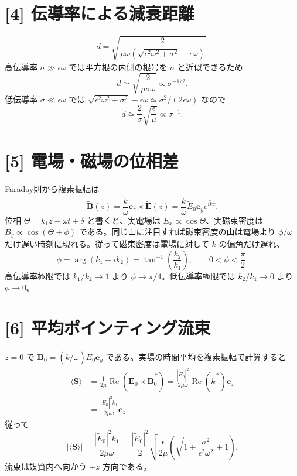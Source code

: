 \documentclass[11pt,a4paper]{article}
\begin{document}
\section*{[4] 伝導率による減衰距離}
\begin{equation}
 d=\sqrt{\frac{2}{\mu\omega\left(\sqrt{\epsilon^2\omega^2+\sigma^2}-\epsilon\omega\right)}}.
\end{equation}
高伝導率 $\sigma\gg\epsilon\omega$ では平方根の内側の根号を $\sigma$ と近似できるため
\begin{equation}
 \boxed{d\simeq\sqrt{\frac{2}{\mu\sigma\omega}}\propto\sigma^{-1/2}}.
\end{equation}
低伝導率 $\sigma\ll\epsilon\omega$ では
$\sqrt{\epsilon^2\omega^2+\sigma^2}-\epsilon\omega\simeq\sigma^2/(2\epsilon\omega)$ なので
\begin{equation}
 \boxed{d\simeq\frac{2}{\sigma}\sqrt{\frac{\epsilon}{\mu}}\propto\sigma^{-1}}.
\end{equation}

\section*{[5] 電場・磁場の位相差}
Faraday則から複素振幅は
\begin{equation}
 \widetilde{\boldsymbol B}(z)=\frac{\widetilde k}{\omega}
 \boldsymbol e_z\times\widetilde{\boldsymbol E}(z)
 =\frac{\widetilde k}{\omega}\widetilde E_0\boldsymbol e_y
 e^{i\widetilde kz}.
\end{equation}
位相 $\Theta=k_1z-\omega t+\delta$ と書くと、実電場は $E_x\propto\cos\Theta$、実磁束密度は $B_y\propto\cos(\Theta+\phi)$ である。同じ山に注目すれば磁束密度の山は電場より $\phi/\omega$ だけ遅い時刻に現れる。従って磁束密度は電場に対して $\widetilde k$ の偏角だけ遅れ、
\begin{equation}
 \boxed{\phi=\arg(k_1+ik_2)=\tan^{-1}\!\left(\frac{k_2}{k_1}\right)},
 \qquad 0<\phi<\frac{\pi}{2}.
\end{equation}
高伝導率極限では $k_1/k_2\to1$ より $\boxed{\phi\to\pi/4}$。低伝導率極限では $k_2/k_1\to0$ より $\boxed{\phi\to0}$。

\section*{[6] 平均ポインティング流束}
$z=0$ で $\widetilde{\boldsymbol B}_0=(\widetilde k/\omega)\widetilde E_0\boldsymbol e_y$ である。実場の時間平均を複素振幅で計算すると
\begin{align}
 \langle\boldsymbol S\rangle
 &=\frac{1}{2\mu}\operatorname{Re}
 \left(\widetilde{\boldsymbol E}_0\times\widetilde{\boldsymbol B}_0^{\,*}\right)
 =\frac{|\widetilde E_0|^2}{2\mu\omega}\operatorname{Re}(\widetilde k^{\,*})\boldsymbol e_z\\
 &=\frac{|\widetilde E_0|^2 k_1}{2\mu\omega}\boldsymbol e_z.
\end{align}
従って
\begin{equation}
 \boxed{|\langle\boldsymbol S\rangle|=
 \frac{|\widetilde E_0|^2 k_1}{2\mu\omega}
 =\frac{|\widetilde E_0|^2}{2}
 \sqrt{\frac{\epsilon}{2\mu}
 \left(\sqrt{1+\frac{\sigma^2}{\epsilon^2\omega^2}}+1\right)}}.
\end{equation}
流束は媒質内へ向かう $+z$ 方向である。
\end{document}

